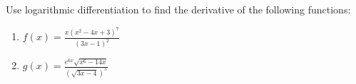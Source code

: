 \documentclass{ximera}
\begin{document}
\begin{exercise} 
   Use logarithmic differentiation to find the derivative of the following functions: 
\begin{enumerate}
    \item $\displaystyle f(x)=\frac{x(x^2-4x+3)^7}{(3x-1)^2}$\\
    \item $\displaystyle g(x)=\frac{e^{6x}\sqrt{x^6-14x}}{(\sqrt{3x-4})^5}$\\
\end{enumerate}
\end{exercise}
\end{document}
